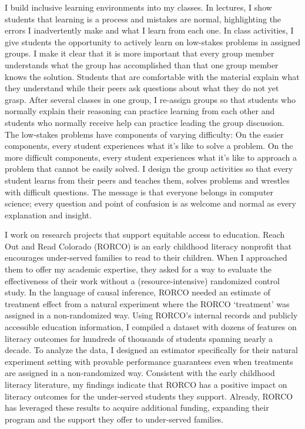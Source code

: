 \documentclass[11pt]{article}
\begin{document}
{I build inclusive learning environments into my classes. In lectures, I show students that learning is a process and mistakes are normal, highlighting the errors I inadvertently make and what I learn from each one. In class activities, I give students the opportunity to actively learn on low-stakes problems in assigned groups. I make it clear that it is more important that every group member understands what the group has accomplished than that one group member knows the solution. Students that are comfortable with the material explain what they understand while their peers ask questions about what they do not yet grasp. After several classes in one group, I re-assign groups so that students who normally explain their reasoning can practice learning from each other and students who normally receive help can practice leading the group discussion. The low-stakes problems have components of varying difficulty: On the easier components, every student experiences what it's like to solve a problem. On the more difficult components, every student experiences what it's like to approach a problem that cannot be easily solved. I design the group activities so that every student learns from their peers and teaches them, solves problems and wrestles with difficult questions. The message is that everyone belongs in computer science; every question and point of confusion is as welcome and normal as every explanation and insight.

I work on research projects that support equitable access to education. Reach Out and Read Colorado (RORCO) is an early childhood literacy nonprofit that encourages under-served families to read to their children. When I approached them to offer my academic expertise, they asked for a way to evaluate the effectiveness of their work without a (resource-intensive) randomized control study. In the language of causal inference, RORCO needed an estimate of treatment effect from a natural experiment where the RORCO `treatment' was assigned in a non-randomized way. Using RORCO's internal records and publicly accessible education information, I compiled a dataset with dozens of features on literacy outcomes for hundreds of thousands of students spanning nearly a decade. To analyze the data, I designed an estimator specifically for their natural experiment setting with provable performance guarantees even when treatments are assigned in a non-randomized way. Consistent with the early childhood literacy literature, my findings indicate that RORCO has a positive impact on literacy outcomes for the under-served students they support. Already, RORCO has leveraged these results to acquire additional funding, expanding their program and the support they offer to under-served families.

}
\end{document}
